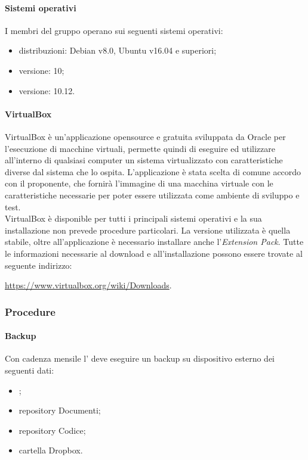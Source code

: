 	\paragraph{Sistemi operativi}
	I membri del gruppo operano sui seguenti sistemi operativi:
	\begin{itemize}
		\item {} distribuzioni: Debian v8.0, Ubuntu v16.04 e superiori;
		\item {} versione: 10;
		\item {} versione: 10.12.
	\end{itemize}
	\paragraph{VirtualBox}
	VirtualBox è un'applicazione opensource e gratuita sviluppata da Oracle per l'esecuzione di macchine virtuali,
	permette quindi di eseguire ed utilizzare all'interno di qualsiasi computer un sistema virtualizzato con caratteristiche diverse dal sistema che lo ospita.
	L'applicazione è stata scelta di comune accordo con il proponente, che fornirà l'immagine di una macchina virtuale con le caratteristiche necessarie per poter essere utilizzata come ambiente di sviluppo e test.\\
	VirtualBox è disponible per tutti i principali sistemi operativi e la sua installazione non prevede procedure particolari. La versione utilizzata è quella stabile, oltre all'applicazione è necessario installare anche l'\textit{Extension Pack}. Tutte le informazioni necessarie al download e all'installazione possono essere trovate al seguente indirizzo:\\ \centerline{\url{https://www.virtualbox.org/wiki/Downloads}.}
	\subsubsection{Procedure}
	\paragraph{Backup}
	Con cadenza mensile l'\amministratore{} deve eseguire un backup su dispositivo esterno dei seguenti dati:
	\begin{itemize}
		\item {} ;
		\item repository Documenti;
		\item repository Codice;
		\item cartella Dropbox.
	\end{itemize}
